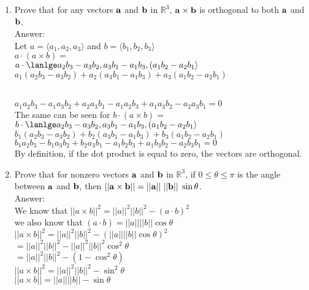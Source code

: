 \documentclass[11pt]{article}
\newcommand{\R}{\ensuremath{\mathbb R}}
\begin{document}
\begin{enumerate}
 
 
 
 
 \item Prove that for any vectors ${\bf a}$ and ${\bf b}$ in $\R^3$, ${\bf a} \times {\bf b}$ is orthogonal to both ${\bf a}$ and ${\bf b}$.
 \\
 Answer:
 \\
 Let $a=\langle a_1,a_2,a_3 \rangle$ and $b= \langle b_1, b_2, b_3 \rangle$
 \\
 $a \cdot (a \times b)=$
 \\
 $ a \cdot \lanlge a_2 b_3 - a_3 b_2, a_3 b_1 - a_1 b_3, (a_1 b_2 - a_2 b_1 \rangle$
 \\
 $a_1(a_2 b_3 - a_3 b_2) + a_2 (a_3 b_1 - a_1 b_3) + a_3 (a_1 b_2 - a_2 b_1)$

 \\
$a_1 a_2 b_3 - a_1 a_3 b_2 + a_2 a_3 b_1 - a_1 a_2 b_3 + a_1 a_3 b_2 - a_2 a_3 b_1= 0$
\\
The same can be seen for  $b \cdot (a \times b)=$
\\
$ b \cdot \lanlge a_2 b_3 - a_3 b_2, a_3 b_1 - a_1 b_3, (a_1 b_2 - a_2 b_1 \rangle$
\\
 $b_1(a_2 b_3 - a_3 b_2) + b_2 (a_3 b_1 - a_1 b_3) + b_3 (a_1 b_2 - a_2 b_1)$
 \\
 $b_1 a_2 b_3 - b_1 a_3 b_2 + b_2 a_3 b_1 - a_1 b_2 b_3 + a_1 b_3 b_2 - a_2 b_3 b_1= 0$
 \\
 By definition, if the dot product is equal to zero, the vectors are orthogonal.

 
 \item Prove that for nonzero vectors ${\bf a}$ and ${\bf b}$ in $\R^3$, if $0 \le \theta \le \pi$ is the angle between ${\bf a}$ and ${\bf b}$, then $|| {\bf a} \times {\bf b}|| = || {\bf a}|| \; || {\bf b}|| \; \sin \theta$.
 \\
 Answer:
 \\
 We know that $|| a \times b||^2= ||a||^2 ||b||^2 - (a \cdot b)^2$
 \\
 we also know that $(a \cdot b) = ||a|| ||b|| \cos \theta $
 \\
 $|| a \times b||^2= ||a||^2 ||b||^2 - (||a|| ||b|| \cos \theta)^2$
 \\
 $=||a||^2 ||b||^2 - ||a||^2 ||b||^2 \cos^2 \theta $
 \\
 $=||a||^2 ||b||^2 - (1 - \cos^2 \theta) $
 \\
 $|| a \times b||^2=||a||^2 ||b||^2 - \sin^2 \theta $
 \\
 $|| a \times b||=||a|| ||b|| - \sin \theta $







\end{enumerate}
\end{document}
